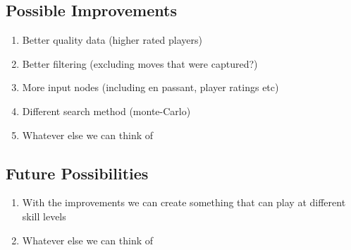 \documentclass[12pt]{article}
\begin{document}
    \subsection{Possible Improvements}

    \begin{enumerate}
        \item Better quality data (higher rated players)
        \item Better filtering (excluding moves that were captured?)
        \item More input nodes (including en passant, player ratings etc)
        \item Different search method (monte-Carlo)
        \item Whatever else we can think of
    \end{enumerate}

    \subsection{Future Possibilities}

    \begin{enumerate}
        \item With the improvements we can create something that can play at different skill levels 
        \item Whatever else we can think of
    \end{enumerate}
    
    \clearpage
    \printbibliography
\end{document}

